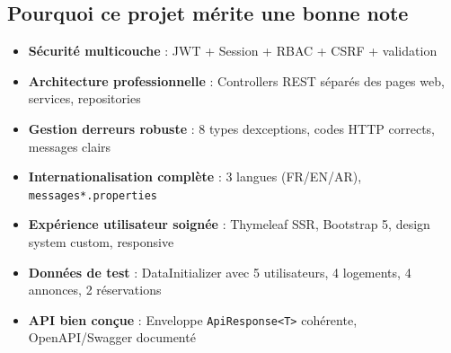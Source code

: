 \documentclass[12pt,a4paper]{article}
\begin{document}
\begin{center}
\end{center}

\subsection{Pourquoi ce projet mérite une bonne note}

\begin{itemize}
  \item \textbf{Sécurité multicouche} : JWT + Session + RBAC + CSRF + validation
  \item \textbf{Architecture professionnelle} : Controllers REST séparés des pages web, services, repositories
  \item \textbf{Gestion d\textquotesingle erreurs robuste} : 8 types d\textquotesingle exceptions, codes HTTP corrects, messages clairs
  \item \textbf{Internationalisation complète} : 3 langues (FR/EN/AR), \texttt{messages*.properties}
  \item \textbf{Expérience utilisateur soignée} : Thymeleaf SSR, Bootstrap 5, design system custom, responsive
  \item \textbf{Données de test} : DataInitializer avec 5 utilisateurs, 4 logements, 4 annonces, 2 réservations
  \item \textbf{API bien conçue} : Enveloppe \texttt{ApiResponse<T>} cohérente, OpenAPI/Swagger documenté
\end{itemize}
\end{document}
